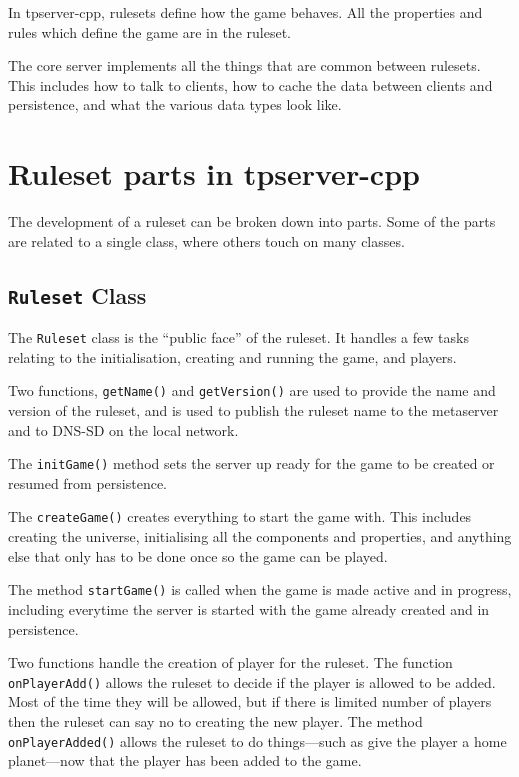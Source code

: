 \documentclass[a4paper,11pt]{report}
\newcommand{\codename}[1]{\texttt{#1}}
\begin{document}
In tpserver-cpp, rulesets define how the game behaves.  All the properties and rules which define the game are in the ruleset.

The core server implements all the things that are common between rulesets. This includes how to talk to clients, how to cache the data between clients and persistence, and what the various data types look like.



\chapter{Ruleset parts in tpserver-cpp}
\label{chap:ruleset-parts}

The development of a ruleset can be broken down into parts. Some of the parts are related to a single class, where others touch on many classes.

\section{\codename{Ruleset} Class}
\label{sec:ruleset-class}

The \codename{Ruleset} class is the ``public face'' of the ruleset. It handles a few tasks relating to the initialisation, creating and running the game, and players.

Two functions, \codename{getName()} and \codename{getVersion()} are used to provide the name and version of the ruleset, and is used to publish the ruleset name to the metaserver and to DNS-SD on the local network.

The \codename{initGame()} method sets the server up ready for the game to be created or resumed from persistence.

The \codename{createGame()} creates everything to start the game with. This includes creating the universe, initialising all the components and properties, and anything else that only has to be done once so the game can be played.

The method \codename{startGame()} is called when the game is made active and in progress, including everytime the server is started with the game already created and in persistence.

Two functions handle the creation of player for the ruleset.  The function \codename{onPlayerAdd()} allows the ruleset to decide if the player is allowed to be added. Most of the time they will be allowed, but if there is limited number of players then the ruleset can say no to creating the new player. The method \codename{onPlayerAdded()} allows the ruleset to do things---such as give the player a home planet---now that the player has been added to the game.
\end{document}
